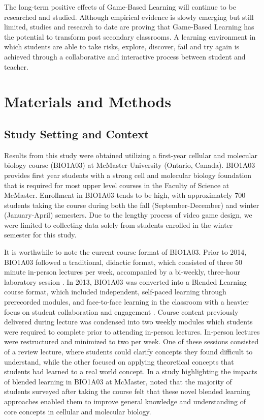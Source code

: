 \documentclass[10pt]{article}
\begin{document}
The long-term positive effects of Game-Based Learning will continue to be researched and studied. Although empirical evidence is slowly emerging but still limited, studies and research to date are proving that Game-Based Learning has the potential to transform post secondary classrooms. A learning environment in which students are able to take risks, explore, discover, fail and try again is achieved through a collaborative and interactive process between student and teacher.

\section{Materials and Methods}

\subsection{Study Setting and Context}

Results from this study were obtained utilizing a first-year cellular and molecular biology course (BIO1A03) at McMaster University (Ontario, Canada). BIO1A03 provides first year students with a strong cell and molecular biology foundation that is required for most upper level courses in the Faculty of Science at McMaster. Enrollment in BIO1A03 tends to be high, with approximately 700 students taking the course during both the fall (September-December) and winter (January-April) semesters. Due to the lengthy process of video game design, we were limited to collecting data solely from students enrolled in the winter semester for this study.

It is worthwhile to note the current course format of BIO1A03. Prior to 2014, BIO1A03 followed a traditional, didactic format, which consisted of three 50 minute in-person lectures per week, accompanied by a bi-weekly, three-hour laboratory session \citep{tahir2022blended}. In 2013, BIO1A03 was converted into a Blended Learning course format, which included independent, self-paced learning through prerecorded modules, and face-to-face learning in the classroom with a heavier focus on student collaboration and engagement \citep{tahir2022blended}. Course content previously delivered during lecture was condensed into two weekly modules which students were required to complete prior to attending in-person lectures. In-person lectures were restructured and minimized to two per week. One of these sessions consisted of a review lecture, where students could clarify concepts they found difficult to understand, while the other focused on applying theoretical concepts that students had learned to a real world concept. In a study highlighting the impacts of blended learning in BIO1A03 at McMaster, \citet{tahir2022blended} noted that the majority of students surveyed after taking the course felt that these novel blended learning approaches enabled them to improve general knowledge and understanding of core concepts in cellular and molecular biology.
\end{document}
